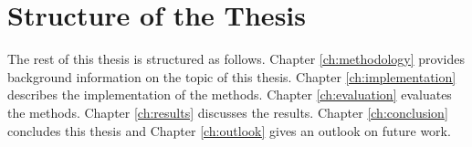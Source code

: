 
\section{Structure of the Thesis}\label{sec:structure-of-the-thesis}
The rest of this thesis is structured as follows.
Chapter \ref{ch:methodology} provides background information on the topic of this thesis.
Chapter \ref{ch:implementation} describes the implementation of the methods.
Chapter \ref{ch:evaluation} evaluates the methods.
Chapter \ref{ch:results} discusses the results.
Chapter \ref{ch:conclusion} concludes this thesis and 
Chapter \ref{ch:outlook} gives an outlook on future work.